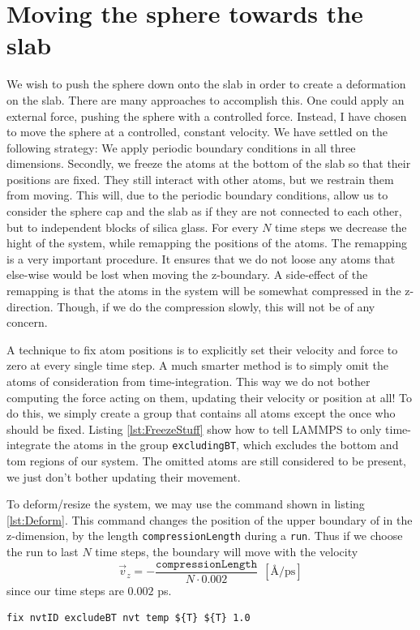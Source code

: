 \documentclass[twoside,english]{uiofysmaster}
\begin{document}
\section{Moving the sphere towards the slab}
We wish to push the sphere down onto the slab in order to create a deformation on the slab. There are many approaches to accomplish this. 
One could apply an external force, pushing the sphere with a controlled force. 
Instead, I have chosen to move the sphere at a controlled, constant velocity.  
We have settled on the following strategy:
We apply periodic boundary conditions in all three dimensions. 
Secondly, we freeze the atoms at the bottom of the slab so that their positions are fixed. They still interact with other atoms, but we restrain them from moving. 
This will, due to the periodic boundary conditions, allow us to consider the sphere cap and the slab as if they are not connected to each other, but to independent blocks of silica glass.  
For every $N$ time steps we decrease the hight of the system, while remapping the positions of the atoms. 
The remapping is a very important procedure. 
It ensures that we do not loose any atoms that else-wise would be lost when moving the z-boundary. 
A side-effect of the remapping is that the atoms in the system will be somewhat compressed in the z-direction. 
Though, if we do the compression slowly, this will not be of any concern. 

A technique to fix atom positions is to explicitly set their velocity and force to zero at every single time step.
A much smarter method is to simply omit the atoms of consideration from time-integration. 
This way we do not bother computing the force acting on them, updating their velocity or position at all! 
To do this, we simply create a group that contains all atoms except the once who should be fixed.
Listing \ref{lst:FreezeStuff} show how to tell LAMMPS to only time-integrate the atoms in the group \texttt{excludingBT}, which excludes the bottom and tom regions of our system.
The omitted atoms are still considered to be present, we just don't bother updating their movement.

To deform/resize the system, we may use the command shown in listing \ref{lst:Deform}. 
This command changes the position of the upper boundary of in the z-dimension, by the length \texttt{compressionLength} during a \texttt{run}.
Thus if we choose the run to last $N$ time steps, the boundary will move with the velocity 
\begin{equation}
	\vec{v}_z = -\frac{\texttt{compressionLength}}{N\cdot0.002} ~~ [\text{\AA/ps}]
\end{equation}
since our time steps are $0.002$ ps.
\begin{lstlisting}[caption={Time-integrating only atoms in a specified group, \texttt{excludeBT}, effectively fixing all others.}, label={lst:FreezeStuff}, language=LammpsInput]
fix nvtID excludeBT nvt temp ${T} ${T} 1.0
\end{lstlisting}
\end{document}
